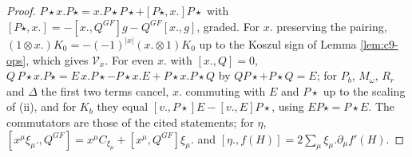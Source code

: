 \begin{proof}
$P\star x.P\star=x.P\star P\star+[P\star,x.]P\star$ with $[P\star,x.]=-[x.,Q^{GF}]g-Q^{GF}[x.,g]$, graded. For $x.$ preserving the pairing, $(1\otimes x.)K_0=-(-1)^{|x|}(x.\otimes1)K_0$ up to the Koszul sign of Lemma \ref{lem:c9-ops}, which gives $\mathcal V_x$. For even $x.$ with $[x.,Q]=0$, $Q\,P\star x.P\star=E\,x.P\star-P\star x.E+P\star x.P\star Q$ by $QP\star+P\star Q=E$; for $P_b$, $M_\omega$, $R_r$ and $\Delta$ the first two terms cancel, $x.$ commuting with $E$ and $P\star$ up to the scaling of (ii), and for $K_b$ they equal $[v.,P\star]E-[v.,E]P\star$, using $EP\star=P\star E$. The commutators are those of the cited statements; for $\eta$, $[x^\mu\xi_\mu.,Q^{GF}]=x^\mu C_{\xi_\mu}+[x^\mu,Q^{GF}]\xi_\mu.$ and $[\eta.,f(H)]=2\sum_\mu\xi_\mu.\partial_\mu f'(H)$.
\end{proof}

